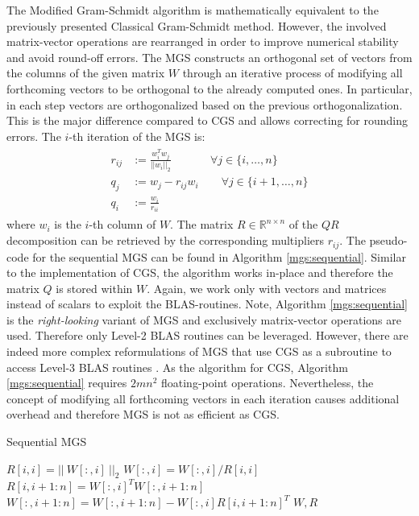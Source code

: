 \documentclass{article}
\begin{document}
The Modified Gram-Schmidt algorithm is mathematically equivalent to the
previously presented Classical Gram-Schmidt method. However, the involved
matrix-vector operations are rearranged in order to improve numerical stability
and avoid round-off errors. The MGS constructs an orthogonal set of vectors from
the columns of the given matrix $W$ through an iterative process of modifying
all forthcoming vectors to be orthogonal to the already computed ones. In
particular, in each step vectors are orthogonalized based on the previous
orthogonalization. This is the major difference compared to CGS and allows
correcting for rounding errors. The $i$-th iteration of the MGS is:
\begin{align}
    \begin{split}
        r_{ij} &:= \frac{w_i^T w_j}{|| w_i ||_2}
        \quad \quad \ \ \quad \forall j \in \{i, \ldots, n\} \\
        q_j &:= w_j - r_{ij} w_i \quad \quad \forall j \in \{i+1, \ldots, n\} \\
        q_i &:= \frac{w_i}{r_{ii}}
    \end{split}
\end{align}
where $w_i$ is the $i$-th column of $W$. The matrix $R \in \mathbb{R}^{n \times
n}$ of the $QR$ decomposition can be retrieved by the corresponding multipliers
$r_{ij}$. The pseudo-code for the sequential MGS can be found in Algorithm
\ref{mgs:sequential}. Similar to the implementation of CGS, the algorithm works
in-place and therefore the matrix $Q$ is stored within $W$. Again, we work only
with vectors and matrices instead of scalars to exploit the BLAS-routines. Note,
Algorithm \ref{mgs:sequential} is the \textit{right-looking} variant of MGS and
exclusively matrix-vector operations are used. Therefore only Level-2 BLAS
routines can be leveraged. However, there are indeed more complex reformulations
of MGS that use CGS as a subroutine to access Level-3 BLAS routines
\cite{GudulaSchwind:2005}. As the algorithm for CGS, Algorithm
\ref{mgs:sequential} requires $2mn^2$ floating-point operations. Nevertheless,
the concept of modifying all forthcoming vectors in each iteration causes
additional overhead and therefore MGS is not as efficient as CGS.
\begin{algorithm}[t]
    \caption{Sequential MGS} \label{mgs:sequential}
    \begin{algorithmic}[1]
            \State $R[i,i] = || \ W[:,i] \ ||_2$
            \State $W[:,i] = W[:,i] / R[i,i] $
                \State $R[i,i+1:n] = W[:,i]^T W[:,i+1:n]$
                \State $W[:,i+1:n] = W[:,i+1:n] - W[:,i] R[i,i+1:n]^T$
            \EndIf
        \EndFor
        \State \Return $W, R$
    \end{algorithmic}
\end{algorithm}
\end{document}
